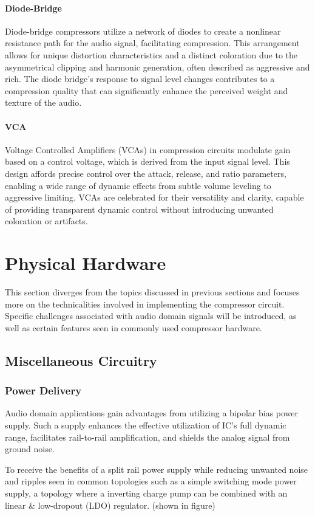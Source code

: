 \documentclass[10pt]{article}
\begin{document}
\begin{multicols*}{2}
                \paragraph{Diode-Bridge}
                    Diode-bridge compressors utilize a network of diodes to create a nonlinear resistance path for the audio signal, facilitating compression. This arrangement allows for unique distortion characteristics and a distinct coloration due to the asymmetrical clipping and harmonic generation, often described as aggressive and rich. The diode bridge's response to signal level changes contributes to a compression quality that can significantly enhance the perceived weight and texture of the audio.

                \paragraph{VCA}
                    Voltage Controlled Amplifiers (VCAs) in compression circuits modulate gain based on a control voltage, which is derived from the input signal level. This design affords precise control over the attack, release, and ratio parameters, enabling a wide range of dynamic effects from subtle volume leveling to aggressive limiting. VCAs are celebrated for their versatility and clarity, capable of providing transparent dynamic control without introducing unwanted coloration or artifacts.  

        \section{Physical Hardware}
            This section diverges from the topics discussed in previous sections and focuses more on the technicalities involved in implementing the compressor circuit. Specific challenges associated with audio domain signals will be introduced, as well as certain features seen in commonly used compressor hardware.

            \subsection{Miscellaneous Circuitry}

                \subsubsection{Power Delivery}
                    Audio domain applications gain advantages from utilizing a bipolar bias power supply. Such a supply enhances the effective utilization of IC's full dynamic range, facilitates rail-to-rail amplification, and shields the analog signal from ground noise. \cite{ti-3-v-rails}\par
                    To receive the benefits of a split rail power supply while reducing unwanted noise and ripples seen in common topologies such as a simple switching mode power supply, a topology where a inverting charge pump can be combined with an linear \& low-dropout (LDO) regulator. (shown in figure)\par
                    

\end{multicols*}
\end{document}

